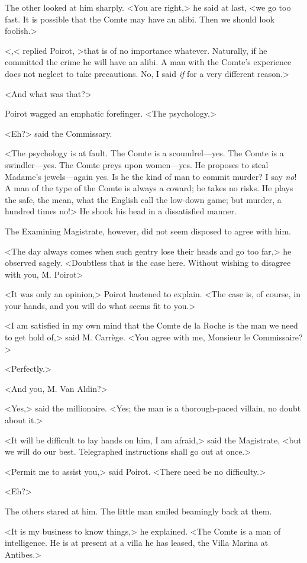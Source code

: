 The other looked at him sharply. <You are right,> he said at last, <we go too fast. It is possible that the Comte may have an alibi. Then we should look foolish.>

<,< replied Poirot, >that is of no importance whatever. Naturally, if he committed the crime he will have an alibi. A man with the Comte's experience does not neglect to take precautions. No, I said \emph{if} for a very different reason.>

<And what was that?>

Poirot wagged an emphatic forefinger. <The psychology.>

<Eh?> said the Commissary.

<The psychology is at fault. The Comte is a scoundrel—yes. The Comte is a swindler—yes. The Comte preys upon women—yes. He proposes to steal Madame's jewels—again yes. Is he the kind of man to commit murder? I say \emph{no}! A man of the type of the Comte is always a coward; he takes no risks. He plays the safe, the mean, what the English call the low-down game; but murder, a hundred times no!> He shook his head in a dissatisfied manner.

The Examining Magistrate, however, did not seem disposed to agree with him.

<The day always comes when such gentry lose their heads and go too far,> he observed sagely. <Doubtless that is the case here. Without wishing to disagree with you, M. Poirot\longdash>

<It was only an opinion,> Poirot hastened to explain. <The case is, of course, in your hands, and you will do what seems fit to you.>

<I am satisfied in my own mind that the Comte de la Roche is the man we need to get hold of,> said M. Carrège. <You agree with me, Monsieur le Commissaire?>

<Perfectly.>

<And you, M. Van Aldin?>

<Yes,> said the millionaire. <Yes; the man is a thorough-paced villain, no doubt about it.>

<It will be difficult to lay hands on him, I am afraid,> said the Magistrate, <but we will do our best. Telegraphed instructions shall go out at once.>

<Permit me to assist you,> said Poirot. <There need be no difficulty.>

<Eh?>

The others stared at him. The little man smiled beamingly back at them.

<It is my business to know things,> he explained. <The Comte is a man of intelligence. He is at present at a villa he has leased, the Villa Marina at Antibes.>